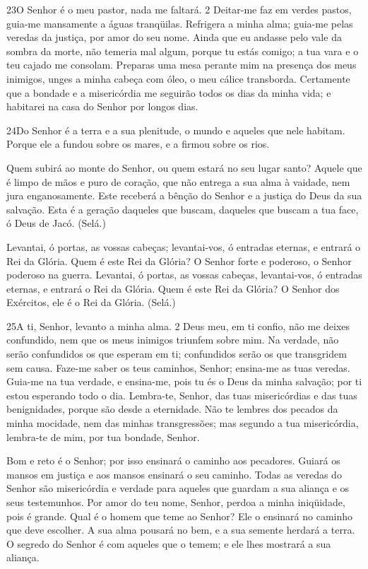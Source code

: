 \bigskip

\lettrine{23}{}O Senhor é o meu pastor, nada me faltará. 2
Deitar-me faz em verdes pastos, guia-me mansamente a águas
tranqüilas. Refrigera a minha alma; guia-me pelas veredas da
justiça, por amor do seu nome. Ainda que eu andasse pelo vale da
sombra da morte, não temeria mal algum, porque tu estás comigo; a
tua vara e o teu cajado me consolam. Preparas uma mesa perante
mim na presença dos meus inimigos, unges a minha cabeça com óleo, o
meu cálice transborda. Certamente que a bondade e a misericórdia
me seguirão todos os dias da minha vida; e habitarei na casa do
Senhor por longos dias.

\bigskip

\lettrine{24}{}Do Senhor é a terra e a sua plenitude, o mundo e
aqueles que nele habitam. Porque ele a fundou sobre os mares, e
a firmou sobre os rios.

Quem subirá ao monte do Senhor, ou quem estará no seu lugar santo?
Aquele que é limpo de mãos e puro de coração, que não entrega a
sua alma à vaidade, nem jura enganosamente. Este receberá a
bênção do Senhor e a justiça do Deus da sua salvação. Esta é a
geração daqueles que buscam, daqueles que buscam a tua face, ó Deus
de Jacó. (Selá.)

Levantai, ó portas, as vossas cabeças; levantai-vos, ó entradas
eternas, e entrará o Rei da Glória. Quem é este Rei da Glória? O
Senhor forte e poderoso, o Senhor poderoso na guerra. Levantai,
ó portas, as vossas cabeças, levantai-vos, ó entradas eternas, e
entrará o Rei da Glória. Quem é este Rei da Glória? O Senhor
dos Exércitos, ele é o Rei da Glória. (Selá.)

\bigskip

\lettrine{25}{}A ti, Senhor, levanto a minha alma. 2 Deus meu,
em ti confio, não me deixes confundido, nem que os meus inimigos
triunfem sobre mim. Na verdade, não serão confundidos os que
esperam em ti; confundidos serão os que transgridem sem causa.
Faze-me saber os teus caminhos, Senhor; ensina-me as tuas
veredas. Guia-me na tua verdade, e ensina-me, pois tu és o Deus
da minha salvação; por ti estou esperando todo o dia. Lembra-te,
Senhor, das tuas misericórdias e das tuas benignidades, porque são
desde a eternidade. Não te lembres dos pecados da minha
mocidade, nem das minhas transgressões; mas segundo a tua
misericórdia, lembra-te de mim, por tua bondade, Senhor.

Bom e reto é o Senhor; por isso ensinará o caminho aos pecadores.
Guiará os mansos em justiça e aos mansos ensinará o seu caminho.
Todas as veredas do Senhor são misericórdia e verdade para
aqueles que guardam a sua aliança e os seus testemunhos. Por
amor do teu nome, Senhor, perdoa a minha iniqüidade, pois é grande.
Qual é o homem que teme ao Senhor? Ele o ensinará no caminho
que deve escolher. A sua alma pousará no bem, e a sua semente
herdará a terra. O segredo do Senhor é com aqueles que o
temem; e ele lhes mostrará a sua aliança.

